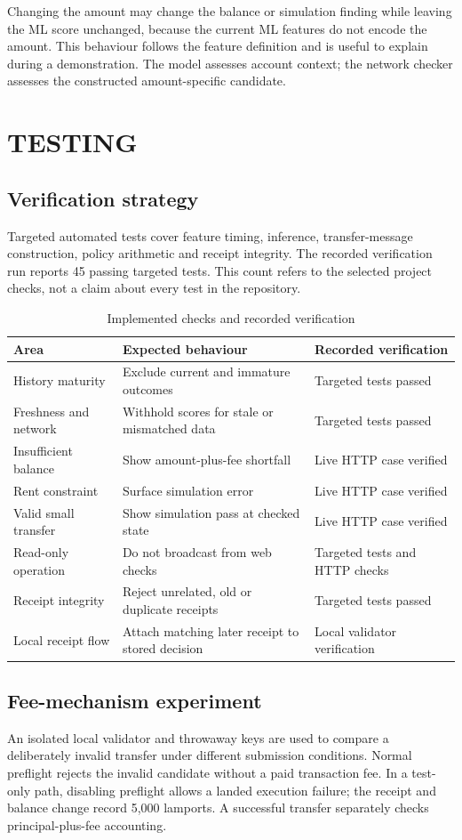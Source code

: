 \documentclass[12pt,a4paper,oneside]{report}
\begin{document}
Changing the amount may change the balance or simulation finding while leaving the ML score unchanged, because the current ML features do not encode the amount. This behaviour follows the feature definition and is useful to explain during a demonstration. The model assesses account context; the network checker assesses the constructed amount-specific candidate.

\chapter{TESTING}
\section{Verification strategy}
Targeted automated tests cover feature timing, inference, transfer-message construction, policy arithmetic and receipt integrity. The recorded verification run reports 45 passing targeted tests. This count refers to the selected project checks, not a claim about every test in the repository.
\begin{table}[ht]\centering\caption{Implemented checks and recorded verification}
\small\begin{tabularx}{\textwidth}{p{35mm}YY}\toprule Area&Expected behaviour&Recorded verification\\\midrule
History maturity&Exclude current and immature outcomes&Targeted tests passed\\
Freshness and network&Withhold scores for stale or mismatched data&Targeted tests passed\\
Insufficient balance&Show amount-plus-fee shortfall&Live HTTP case verified\\
Rent constraint&Surface simulation error&Live HTTP case verified\\
Valid small transfer&Show simulation pass at checked state&Live HTTP case verified\\
Read-only operation&Do not broadcast from web checks&Targeted tests and HTTP checks\\
Receipt integrity&Reject unrelated, old or duplicate receipts&Targeted tests passed\\
Local receipt flow&Attach matching later receipt to stored decision&Local validator verification\\\bottomrule\end{tabularx}\end{table}
\section{Fee-mechanism experiment}
An isolated local validator and throwaway keys are used to compare a deliberately invalid transfer under different submission conditions. Normal preflight rejects the invalid candidate without a paid transaction fee. In a test-only path, disabling preflight allows a landed execution failure; the receipt and balance change record 5,000 lamports. A successful transfer separately checks principal-plus-fee accounting.
\end{document}
